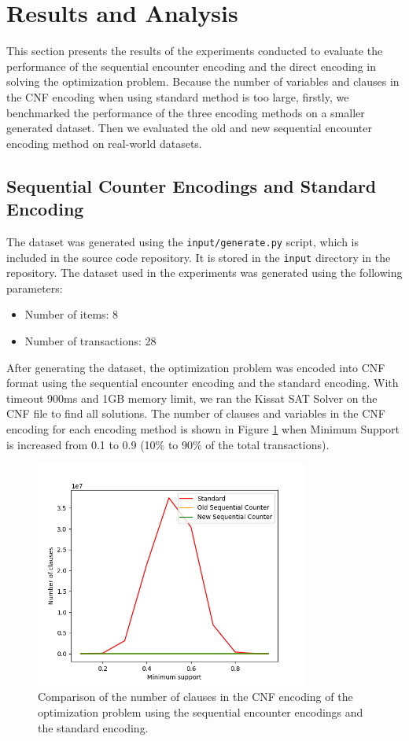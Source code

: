 \section{Results and Analysis}
This section presents the results of the experiments conducted to evaluate the performance of the sequential encounter encoding and the direct encoding in solving the optimization problem.
Because the number of variables and clauses in the CNF encoding when using standard method is too large,
firstly, we benchmarked the performance of the three encoding methods on a smaller generated dataset.
Then we evaluated the old and new sequential encounter encoding method on real-world datasets.

\subsection{Sequential Counter Encodings and Standard Encoding}

The dataset was generated using the \texttt{input/generate.py} script, which is included in the source code repository.
It is stored in the \texttt{input} directory in the repository.
The dataset used in the experiments was generated using the following parameters:
\begin{itemize}
    \item Number of items: 8
    \item Number of transactions: 28
\end{itemize}

After generating the dataset, the optimization problem was encoded into CNF format using the sequential encounter encoding and the standard encoding.
With timeout 900ms and 1GB memory limit, we ran the Kissat SAT Solver on the CNF file to find all solutions.
The number of clauses and variables in the CNF encoding for each encoding method is shown in Figure \ref{fig:4_1} when Minimum Support is increased from 0.1 to 0.9 (10\% to 90\% of the total transactions).

\begin{figure}[H]
    \centering
    \includegraphics[width=0.8\textwidth]{chapter4/image/n_trans_28_clauses.png}
    \caption{Comparison of the number of clauses in the CNF encoding of the optimization problem using the sequential encounter encodings and the standard encoding.}
    \label{fig:4_1}
\end{figure}


